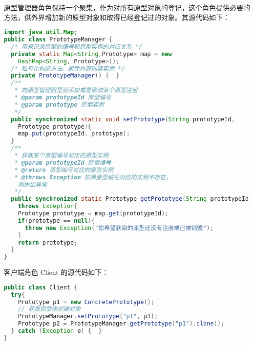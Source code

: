 \documentclass[../main.tex]{subfiles}
\begin{document}
%
原型管理器角色保持一个聚集，作为对所有原型对象的登记，这个角色提供必要的方法，供外界增加新的原型对象和取得已经登记过的对象。其源代码如下：
\begin{lstlisting}[language=java]
import java.util.Map;
public class PrototypeManager {
  /* 用来记录原型的编号和原型实例的对应关系 */
  private static Map<String,Prototype> map = new
    HashMap<String, Prototype>();
  /* 私有化构造方法，避免外部创建实例 */
  private PrototypeManager() {  }
  /**
   * 向原型管理器里面添加或是修改某个原型注册
   * @param prototypeId 原型编号
   * @param prototype 原型实例
   */
  public synchronized static void setPrototype(String prototypeId,
    Prototype prototype){
    map.put(prototypeId, prototype);
  }
  /**
   * 获取某个原型编号对应的原型实例
   * @param prototypeId 原型编号
   * @return 原型编号对应的原型实例
   * @throws Exception 如果原型编号对应的实例不存在，
    则抛出异常
   */
  public synchronized static Prototype getPrototype(String prototypeId)
    throws Exception{
    Prototype prototype = map.get(prototypeId);
    if(prototype == null){
      throw new Exception("您希望获取的原型还没有注册或已被销毁");
    }
    return prototype;
  }
}
\end{lstlisting}
%
客户端角色 Client 的源代码如下：
\begin{lstlisting}[language=java]
public class Client {
  try{
    Prototype p1 = new ConcretePrototype();
    // 获取原型来创建对象
    PrototypeManager.setPrototype("p1", p1);
    Prototype p2 = PrototypeManager.getPrototype("p1").clone();
  } catch (Exception e) {  }
}
\end{lstlisting}
\end{document}
